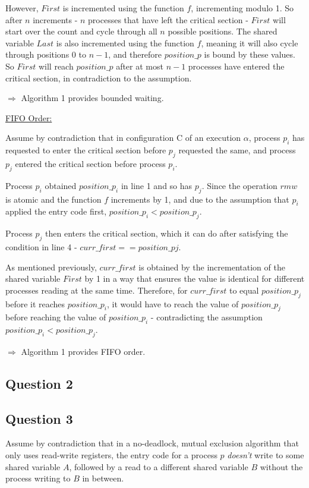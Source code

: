 \documentclass{article}
\begin{document}
However, $First$ is incremented using the function $f$, incrementing
modulo 1. So after $n$ increments - $n$ processes that have left
the critical section - $First$ will start over the count and cycle
through all $n$ possible positions. The shared variable $Last$ is
also incremented using the function $f$, meaning it will also cycle
through positions $0$ to $n-1$, and therefore $position\_p$ is
bound by these values. So $First$ will reach $position\_p$ after
at most $n-1$ processes have entered the critical section, in contradiction
to the assumption.

$\Rightarrow$ Algorithm 1 provides bounded waiting.

\uline{FIFO Order:}

Assume by contradiction that in configuration C of an execution $\alpha$,
process $p_{i}$ has requested to enter the critical section before
$p_{j}$ requested the same, and process $p_{j}$ entered the critical
section before process $p_{i}$.

Process $p_{i}$ obtained $position\_p_{i}$ in line 1 and so has
$p_{j}$. Since the operation $rmw$ is atomic and the function $f$
increments by 1, and due to the assumption that $p_{i}$ applied the
entry code first, $position\_p_{i}<position\_p_{j}$.

Process $p_{j}$ then enters the critical section, which it can do
after satisfying the condition in line 4 - $curr\_first==position\_pj$.

As mentioned previously, $curr\_first$ is obtained by the incrementation
of the shared variable $First$ by 1 in a way that ensures the value
is identical for different processes reading at the same time. Therefore,
for $curr\_first$ to equal $position\_p_{j}$ before it reaches $position\_p_{i}$,
it would have to reach the value of $position\_p_{j}$ before reaching
the value of $position\_p_{i}$ - contradicting the assumption $position\_p_{i}<position\_p_{j}$.

$\Rightarrow$ Algorithm 1 provides FIFO order.

\subsection*{Question 2}


\subsection*{Question 3}

Assume by contradiction that in a no-deadlock, mutual exclusion algorithm
that only uses read-write registers, the entry code for a process
$p$ \emph{doesn't} write to some shared variable $A$, followed by
a read to a different shared variable $B$ without the process writing
to $B$ in between.
\end{document}
